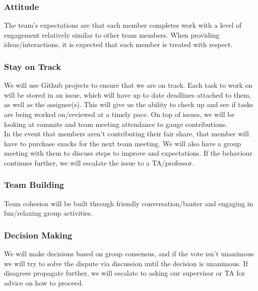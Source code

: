 \documentclass{article}
\begin{document}
\subsubsection*{Attitude}

The team's expectations are that each member completes work with a level of engagement
relatively similar to other team members. When providing ideas/interactions, it is 
expected that each member is treated with respect.

\subsubsection*{Stay on Track}

We will use Github projects to ensure that we are on track. Each task to work on
will be stored in an issue, which will have up to date deadlines attached to them, 
as well as the assignee(s). This will give us the ability to check up and see if 
tasks are being worked on/reviewed at a timely pace. On top of issues, we will 
be looking at commits and team meeting attendance to gauge contributions.\\

In the event that members aren't contributing their fair share, that member will have
to purchase snacks for the next team meeting. We will also have a group meeting with 
them to discuss steps to improve and expectations. If the behaviour continues further, 
we will escalate the issue to a TA/professor.

\subsubsection*{Team Building}

Team cohesion will be built through friendly conversation/banter and engaging
in fun/relaxing group activities.

\subsubsection*{Decision Making} 

We will make decisions based on group consensus, and if the vote isn't unanimous we will try to solve the dispute
via discussion until the decision is unanimous. If disagrees propagate further, we will escalate to asking our supervisor
or TA for advice on how to proceed.
\end{document}
